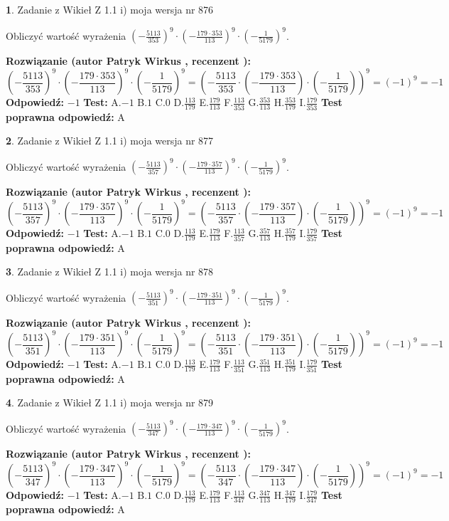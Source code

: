 \documentclass[12pt, a4paper]{article}
\theoremstyle{definition} %
\newtheorem{zad}{}
\newcommand{\zadStart}[1]{\begin{zad}#1\newline}
\newcommand{\zadStop}{\end{zad}}
\newcommand{\rozwStart}[2]{\noindent \textbf{Rozwiązanie (autor #1 , recenzent #2): }\newline}
\newcommand{\rozwStop}{\newline}
\newcommand{\odpStart}{\noindent \textbf{Odpowiedź:}\newline}
\newcommand{\odpStop}{\newline}
\newcommand{\testStart}{\noindent \textbf{Test:}\newline}
\newcommand{\testStop}{\newline}
\newcommand{\kluczStart}{\noindent \textbf{Test poprawna odpowiedź:}\newline}
\newcommand{\kluczStop}{\newline}
\begin{document}
\zadStart{Zadanie z Wikieł Z 1.1 i) moja wersja nr 876}

Obliczyć wartość wyrażenia $(-\frac{5113}{353})^{9} \cdot (-\frac{179 \cdot 353}{113})^{9} \cdot (-\frac{1}{5179})^{9}$.
\zadStop
\rozwStart{Patryk Wirkus}{}
$$(-\frac{5113}{353})^{9} \cdot (-\frac{179 \cdot 353}{113})^{9} \cdot (-\frac{1}{5179})^{9} = (-\frac{5113}{353} \cdot (-\frac{179 \cdot 353}{113}) \cdot (-\frac{1}{5179}))^{9} = (-1)^{9} = -1$$
\rozwStop
\odpStart
$-1$
\odpStop
\testStart
A.$-1$ B.$1$ C.$0$ D.$\frac{113}{179}$ E.$\frac{179}{113}$
F.$\frac{113}{353}$ G.$\frac{353}{113}$
H.$\frac{353}{179}$
I.$\frac{179}{353}$
\testStop
\kluczStart
A
\kluczStop



\zadStart{Zadanie z Wikieł Z 1.1 i) moja wersja nr 877}

Obliczyć wartość wyrażenia $(-\frac{5113}{357})^{9} \cdot (-\frac{179 \cdot 357}{113})^{9} \cdot (-\frac{1}{5179})^{9}$.
\zadStop
\rozwStart{Patryk Wirkus}{}
$$(-\frac{5113}{357})^{9} \cdot (-\frac{179 \cdot 357}{113})^{9} \cdot (-\frac{1}{5179})^{9} = (-\frac{5113}{357} \cdot (-\frac{179 \cdot 357}{113}) \cdot (-\frac{1}{5179}))^{9} = (-1)^{9} = -1$$
\rozwStop
\odpStart
$-1$
\odpStop
\testStart
A.$-1$ B.$1$ C.$0$ D.$\frac{113}{179}$ E.$\frac{179}{113}$
F.$\frac{113}{357}$ G.$\frac{357}{113}$
H.$\frac{357}{179}$
I.$\frac{179}{357}$
\testStop
\kluczStart
A
\kluczStop



\zadStart{Zadanie z Wikieł Z 1.1 i) moja wersja nr 878}

Obliczyć wartość wyrażenia $(-\frac{5113}{351})^{9} \cdot (-\frac{179 \cdot 351}{113})^{9} \cdot (-\frac{1}{5179})^{9}$.
\zadStop
\rozwStart{Patryk Wirkus}{}
$$(-\frac{5113}{351})^{9} \cdot (-\frac{179 \cdot 351}{113})^{9} \cdot (-\frac{1}{5179})^{9} = (-\frac{5113}{351} \cdot (-\frac{179 \cdot 351}{113}) \cdot (-\frac{1}{5179}))^{9} = (-1)^{9} = -1$$
\rozwStop
\odpStart
$-1$
\odpStop
\testStart
A.$-1$ B.$1$ C.$0$ D.$\frac{113}{179}$ E.$\frac{179}{113}$
F.$\frac{113}{351}$ G.$\frac{351}{113}$
H.$\frac{351}{179}$
I.$\frac{179}{351}$
\testStop
\kluczStart
A
\kluczStop



\zadStart{Zadanie z Wikieł Z 1.1 i) moja wersja nr 879}

Obliczyć wartość wyrażenia $(-\frac{5113}{347})^{9} \cdot (-\frac{179 \cdot 347}{113})^{9} \cdot (-\frac{1}{5179})^{9}$.
\zadStop
\rozwStart{Patryk Wirkus}{}
$$(-\frac{5113}{347})^{9} \cdot (-\frac{179 \cdot 347}{113})^{9} \cdot (-\frac{1}{5179})^{9} = (-\frac{5113}{347} \cdot (-\frac{179 \cdot 347}{113}) \cdot (-\frac{1}{5179}))^{9} = (-1)^{9} = -1$$
\rozwStop
\odpStart
$-1$
\odpStop
\testStart
A.$-1$ B.$1$ C.$0$ D.$\frac{113}{179}$ E.$\frac{179}{113}$
F.$\frac{113}{347}$ G.$\frac{347}{113}$
H.$\frac{347}{179}$
I.$\frac{179}{347}$
\testStop
\kluczStart
A
\kluczStop
\end{document}
